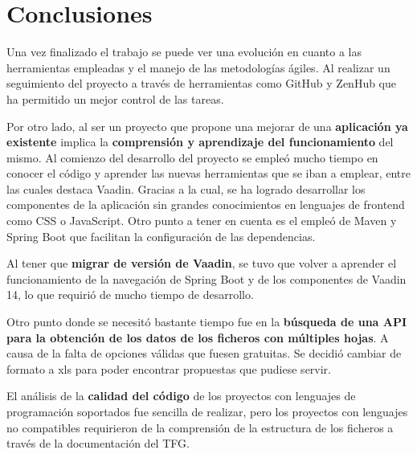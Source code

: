 
\section{Conclusiones}
Una vez finalizado el trabajo se puede ver una evolución en cuanto a las herramientas empleadas y el manejo de las metodologías ágiles. Al realizar un seguimiento del proyecto a través de herramientas como GitHub y ZenHub que ha permitido un mejor control de las tareas.

Por otro lado, al ser un proyecto que propone una mejorar de una \textbf{aplicación ya existente} implica la \textbf{comprensión y aprendizaje del funcionamiento} del mismo. Al comienzo del desarrollo del proyecto se empleó mucho tiempo en conocer el código y aprender las nuevas herramientas que se iban a emplear, entre las cuales destaca Vaadin. Gracias a la cual, se ha logrado desarrollar los componentes de la aplicación sin grandes conocimientos en lenguajes de frontend como CSS o JavaScript. 
Otro punto a tener en cuenta es el empleó de Maven y Spring Boot que facilitan la configuración de las dependencias.

Al tener que \textbf{migrar de versión de Vaadin}, se tuvo que volver a aprender el funcionamiento de la navegación de Spring Boot y de los componentes de Vaadin 14, lo que requirió de mucho tiempo de desarrollo.

Otro punto donde se necesitó bastante tiempo fue en la \textbf{búsqueda de una API para la obtención de los datos de los ficheros con múltiples hojas}. A causa de la falta de opciones válidas que fuesen gratuitas. Se decidió cambiar de formato a xls para poder encontrar propuestas que pudiese servir.

El análisis de la \textbf{calidad del código} de los proyectos con lenguajes de programación soportados fue sencilla de realizar, pero los proyectos con lenguajes no compatibles requirieron de la comprensión de la estructura de los ficheros a través de la documentación del TFG. 

